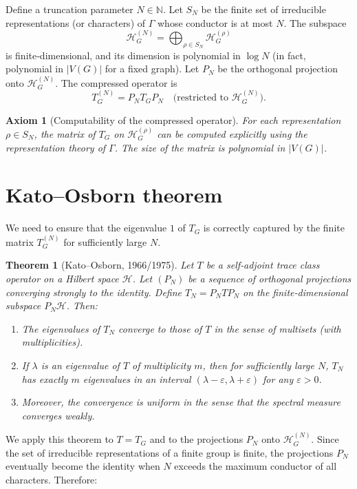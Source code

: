 \documentclass[11pt,a4paper]{article}
\newtheorem{theorem}{Theorem}[section]
\newtheorem{axiom}{Axiom}[section]
\begin{document}
Define a truncation parameter \(N \in \mathbb{N}\). Let \(S_N\) be the finite set of irreducible representations (or characters) of \(\Gamma\) whose conductor is at most \(N\). The subspace
\[
\mathcal{H}_G^{(N)} = \bigoplus_{\rho \in S_N} \mathcal{H}_G^{(\rho)}
\]
is finite‑dimensional, and its dimension is polynomial in \(\log N\) (in fact, polynomial in \(|V(G)|\) for a fixed graph). Let \(P_N\) be the orthogonal projection onto \(\mathcal{H}_G^{(N)}\). The compressed operator is
\[
T_G^{(N)} = P_N T_G P_N \quad \text{(restricted to } \mathcal{H}_G^{(N)}).
\]

\begin{axiom}[Computability of the compressed operator]
For each representation \(\rho \in S_N\), the matrix of \(T_G\) on \(\mathcal{H}_G^{(\rho)}\) can be computed explicitly using the representation theory of \(\Gamma\). The size of the matrix is polynomial in \(|V(G)|\).
\end{axiom}

\section{Kato–Osborn theorem}

We need to ensure that the eigenvalue \(1\) of \(T_G\) is correctly captured by the finite matrix \(T_G^{(N)}\) for sufficiently large \(N\).

\begin{theorem}[Kato–Osborn, 1966/1975]
Let \(T\) be a self‑adjoint trace class operator on a Hilbert space \(\mathcal{H}\). Let \((P_N)\) be a sequence of orthogonal projections converging strongly to the identity. Define \(T_N = P_N T P_N\) on the finite‑dimensional subspace \(P_N \mathcal{H}\). Then:
\begin{enumerate}
\item The eigenvalues of \(T_N\) converge to those of \(T\) in the sense of multisets (with multiplicities).
\item If \(\lambda\) is an eigenvalue of \(T\) of multiplicity \(m\), then for sufficiently large \(N\), \(T_N\) has exactly \(m\) eigenvalues in an interval \((\lambda - \varepsilon, \lambda + \varepsilon)\) for any \(\varepsilon>0\).
\item Moreover, the convergence is uniform in the sense that the spectral measure converges weakly.
\end{enumerate}
\end{theorem}

We apply this theorem to \(T = T_G\) and to the projections \(P_N\) onto \(\mathcal{H}_G^{(N)}\). Since the set of irreducible representations of a finite group is finite, the projections \(P_N\) eventually become the identity when \(N\) exceeds the maximum conductor of all characters. Therefore:
\end{document}
